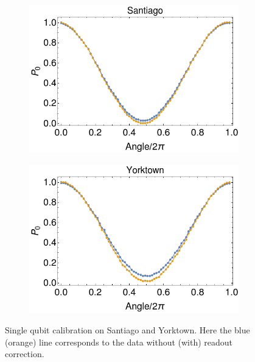 \begin{figure}[H]
    \centering
    \begin{subfigure}{.5\textwidth}
      \centering
      \includegraphics[width=\textwidth]{Figures/Calibrations/calibration_santiago.png}
    \end{subfigure}%
    \begin{subfigure}{.5\textwidth}
      \centering
      \includegraphics[width=\textwidth]{Figures/Calibrations/calibration_ibmqx2.png}
    \end{subfigure}
    \caption{Single qubit calibration on Santiago and Yorktown. Here the blue (orange) line corresponds to the data without (with) readout correction.}
    \label{fig:pc_yorktown_sphere}
\end{figure}


